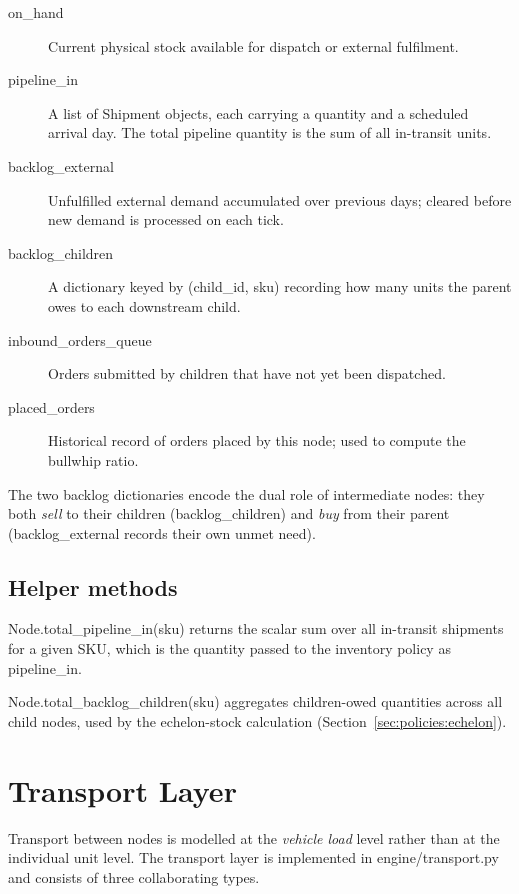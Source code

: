 \begin{description}
  \item[on\_hand] Current physical stock available for dispatch or
        external fulfilment.
  \item[pipeline\_in] A list of Shipment objects, each
        carrying a quantity and a scheduled arrival day.  The total pipeline
        quantity is the sum of all in-transit units.
  \item[backlog\_external] Unfulfilled external demand accumulated
        over previous days; cleared before new demand is processed on each
        tick.
  \item[backlog\_children] A dictionary keyed by (child\_id,
        sku) recording how many units the parent owes to each downstream
        child.
  \item[inbound\_orders\_queue] Orders submitted by children that
        have not yet been dispatched.
  \item[placed\_orders] Historical record of orders placed by this
        node; used to compute the bullwhip ratio.
\end{description}

The two backlog dictionaries encode the dual role of intermediate nodes:
they both \emph{sell} to their children (backlog\_children) and
\emph{buy} from their parent (backlog\_external records their own unmet need).

\subsection{Helper methods}

Node.total\_pipeline\_in(sku) returns the scalar sum over all
in-transit shipments for a given SKU, which is the quantity passed to the
inventory policy as pipeline\_in.

Node.total\_backlog\_children(sku) aggregates children-owed
quantities across all child nodes, used by the echelon-stock calculation
(Section~\ref{sec:policies:echelon}).

\section{Transport Layer}
\label{sec:arch:transport}

Transport between nodes is modelled at the \emph{vehicle load} level rather
than at the individual unit level.  The transport layer is implemented in
engine/transport.py and consists of three collaborating types.

